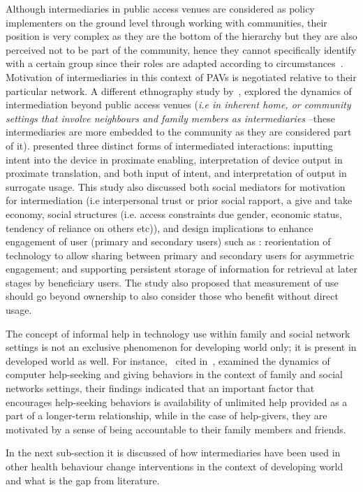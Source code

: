 Although intermediaries in public access venues are considered as policy implementers on the ground level through working with communities, their position is very complex as they are the bottom of the hierarchy but they are also perceived not to be part of the community, hence they cannot specifically identify with a certain group since their roles are adapted according to circumstances~\citep{bailur2010liminal}. Motivation of intermediaries in this context of PAVs is negotiated relative to their particular network. A different ethnography study by~\cite{sambasivan2010}, explored the dynamics of intermediation beyond public access venues (\emph{i.e in inherent home, or community settings that involve neighbours and family members as intermediaries} --these intermediaries are more embedded to the community as they are considered part of it). \cite{sambasivan2010} presented three distinct forms of intermediated interactions: inputting intent into the device in proximate enabling, interpretation of device output in proximate translation, and both input of intent, and interpretation of output in surrogate usage. This study also discussed both social mediators for motivation for intermediation (i.e interpersonal trust or prior social rapport, a give and take economy, social structures (i.e. access constraints due gender, economic status, tendency of reliance on others etc)), and design implications to enhance engagement of user (primary and secondary users) such as : reorientation of technology  to allow sharing between primary and secondary users for asymmetric engagement; and supporting persistent storage of information for retrieval at later stages by beneficiary users. The study also proposed that measurement of use should go beyond ownership to also consider those who benefit without direct usage. 

The concept of informal help in technology use within family and social network settings is not an exclusive  phenomenon for developing world only; it is present in developed world as well. For instance,~\cite{poole:chh} cited in~\cite{katule2016leveraging}, examined the dynamics of computer help-seeking and giving behaviors in the context of family and social networks settings, their findings indicated that an important factor that  encourages help-seeking behaviors is availability of unlimited help provided as a part of a longer-term relationship, while in the case of help-givers, they are motivated by a sense of being accountable to their family members and friends.

In the next sub-section it is discussed of how intermediaries have been used in other health behaviour change interventions in the context of developing world and what is the gap from literature.

